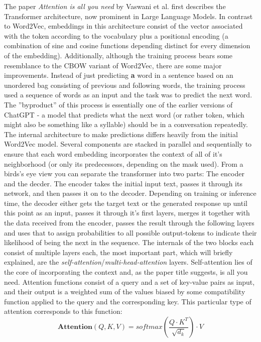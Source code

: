\documentclass[draft,final]{vutinfth} %
\begin{document}
The paper \textit{Attention is all you need} \cite{vaswani_attention_2017} by Vaswani et al. first describes the Transformer architecture, now prominent in Large Language Models. In contrast to Word2Vec, embeddings in this architecture consist of the vector associated with the token according to the vocabulary plus a positional encoding (a combination of sine and cosine functions depending distinct for every dimension of the embedding). Additionally, although the training process bears some resemblance to the CBOW variant of Word2Vec, there are some major improvements. Instead of just predicting \textbf{a} word in a sentence based on an unordered bag consisting of previous and following words, the training process used a sequence of words as an input and the task was to predict the next word. The ''byproduct'' of this process is essentially one of the earlier versions of ChatGPT - a model that predicts what the next word (or rather token, which might also be something like a syllable) should be in a conversation repeatedly. The internal architecture to make predictions differs heavily from the initial Word2Vec model. Several components are stacked in parallel and sequentially to ensure that each word embedding incorporates the context of all of it's neighborhood (or only its predecessors, depending on the mask used). From a birds's eye view you can separate the transformer into two parts: The encoder and the decder. The encoder takes the initial input text, passes it through its network, and then passes it on to the decoder. Depending on training or inference time, the decoder either gets the target text or the generated response up until this point as an input, passes it through it's first layers, merges it together with the data received from the encoder, passes the result through the following layers and uses that to assign probabilities to all possible output-tokens to indicate their likelihood of being the next in the sequence. The internals of the two blocks each consist of multiple layers each, the most important part, which will briefly explained, are the \textit{self-attention}/\textit{multi-head-attention} layers. Self-attention lies of the core of incorporating the context and, as the paper title suggests, is all you need. Attention functions consist of a query and a set of key-value pairs as input, and their output is a weighted sum of the values biased by some compatibility function applied to the query and the corresponding key. This particular type of attention corresponds to this function: 
$$\mathbf{Attention}(Q,K,V) = softmax(\frac{Q \cdot K^T}{\sqrt{d_k}}) \cdot V$$
\end{document}

